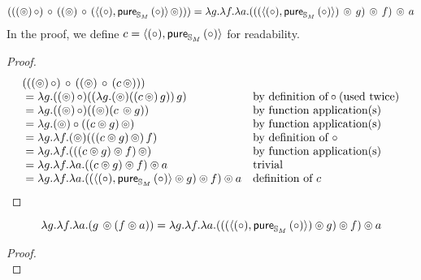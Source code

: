 \begin{lemma}
$$
(((\circledcirc)\, \circ)\, \circ\, ((\circledcirc)\, \circ\, (\langle (\circ), \mathsf{pure}_{\mathbb{S}_{M}}\,(\circ) \rangle\, \circledcirc))) = \lambda g. \lambda f. \lambda a. ( ( (\langle (\circ), \mathsf{pure}_{\mathbb{S}_{M}}\,(\circ) \rangle)\, \circledcirc\, g )\, \circledcirc\, f )\, \circledcirc\, a
$$
In the proof, we define $c = \langle (\circ), \mathsf{pure}_{\mathbb{S}_{M}}\,(\circ) \rangle$ for readability.
\end{lemma}
\begin{proof}
$$
\begin{array}{ll}
(((\circledcirc)\, \circ)\, \circ\, ((\circledcirc)\, \circ\, (c\, \circledcirc)))\\
{}= \lambda g. ((\circledcirc)\, \circ) ((\lambda g . (\circledcirc) ((c\, \circledcirc)\, g))\, g)
&\mbox{by definition of}\circ\mbox{(used twice)}\\
{}= \lambda g. ((\circledcirc)\, \circ) ((\circledcirc) (c\, \circledcirc g))
&\mbox{by function application(s)}\\
{}= \lambda g. (\circledcirc) \circ ((c \circledcirc g)\, \circledcirc)
&\mbox{by function application(s)}\\
{}= \lambda g. \lambda f . (\circledcirc) (((c \circledcirc g)\, \circledcirc)\, f)
&\mbox{by definition of }\circ\\
{}= \lambda g. \lambda f . (((c \circledcirc g) \circledcirc f)\, \circledcirc) 
&\mbox{by function application(s)}\\
{}= \lambda g. \lambda f . \lambda a . ((c \circledcirc g)\circledcirc f) \circledcirc a
&\mbox{trivial}\\
{}= \lambda g. \lambda f . \lambda a . ((\langle (\circ), \mathsf{pure}_{\mathbb{S}_{M}}\,(\circ) \rangle \circledcirc g)\circledcirc f) \circledcirc a
&\mbox{definition of }c\\
\end{array}
$$
\end{proof}

\begin{lemma}
$$
\lambda g . \lambda f . \lambda a .(g\, \circledcirc (f \circledcirc a)) = \lambda g. \lambda f. \lambda a. ( ( (\langle (\circ), \mathsf{pure}_{\mathbb{S}_{M}}\,(\circ) \rangle) \circledcirc g ) \circledcirc f ) \circledcirc a
$$
\end{lemma}
\begin{proof}
$$
$$
\end{proof}


